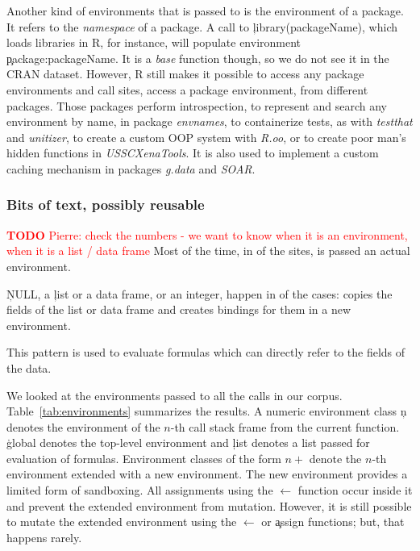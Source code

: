 \documentclass[screen,acmsmall]{acmart}
\newcommand{\authorcomment}[3]{\xspace\textcolor{#1}{{\bf #2} #3}\xspace}
\newcommand{\todo}[1]{\authorcomment{red}{TODO}{#1}}
\begin{document}
Another kind of environments that is passed to \eval is the environment of a
package. It refers to the \emph{namespace} of a package. A call to
\c{library(packageName)}, which loads libraries in R, for instance, will
populate environment \c{package:packageName}. It is a \emph{base} function
though, so we do not see it in the CRAN dataset. However, R still makes it
possible to access any package environments and \packageNbPackageEnvSites call
sites, \ie \packagePackageEnvSitePercent access a package environment, from
\packageNbPackageEnvPackages different packages. Those packages perform
introspection, to represent and search any environment by name, in package
\emph{envnames}, to containerize tests, as with \emph{testthat} and
\emph{unitizer}, to create a custom OOP system with \emph{R.oo}, or to create
poor man's hidden functions in \emph{USSCXenaTools}. It is also used to
implement a custom caching mechanism in packages \emph{g.data} and \emph{SOAR}.


\subsubsection{Bits of text, possibly reusable}

\todo{Pierre: check the numbers - we want to know when it is an environment, when it is a list / data frame}
Most of the time, \ie in \packageEnvirEnvSitePercent of the sites, \eval is
passed an actual environment.

\c{NULL}, a \c{list} or a data frame, or an integer, happen in
\packageEnvirUnusualSitePercent of the cases: \eval copies the fields of the
list or data frame and creates bindings for them in a new environment.

This pattern is used to evaluate formulas which can directly refer to the fields
of the data.


We looked at the environments passed to all the \eval calls in our corpus.
Table~\ref{tab:environments} summarizes the results. A numeric environment class
\c{n} denotes the environment of the $n$-th call stack frame from the current
function. \c{global} denotes the top-level environment and \c{list} denotes a
list passed for evaluation of formulas. Environment classes of the form $n+$
denote the $n$-th environment extended with a new environment. The new
environment provides a limited form of sandboxing. All assignments using the
$\leftarrow$ function occur inside it and prevent the extended environment from
mutation. However, it is still possible to mutate the extended environment using
the $\leftarrow$ or \c{assign} functions; but, that happens rarely.
\end{document}

